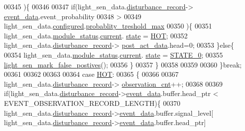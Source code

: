 \begin{DoxyCode}
00345                )\{
00346 
00347                    \textcolor{keywordflow}{if}(light\_sen\_data.\hyperlink{a00024_ac9b38e2c1d3f1013a88d33506c754152}{disturbance\_record}->
      \hyperlink{a00028_a8c0bda69e71ef674e60da47ad0be9ab0}{event\_data}.event\_probability
00348                     >
00349                     light\_sen\_data.\hyperlink{a00024_a94b2d1f6ea4ab334c74d24984dd27843}{configured}.\hyperlink{a00021_a7e2d217b9c9051d361319180a426851c}{probablity\_treshold\_max}
00350                     )\{
00351                          light\_sen\_data.\hyperlink{a00024_a5a53c391562b059eb744ac679f3765ca}{module\_status}.\hyperlink{a00017_ab8af48cdbba92b3ae39c4470e53af944}{current}.
      \hyperlink{a00017_a6b8d8e916bc56265a3fd279bd26b6d1b}{state} = \hyperlink{a00021_a1eb14cc432874ddacd1934791dbe12a3}{HOT};
00352                          light\_sen\_data.\hyperlink{a00024_ac9b38e2c1d3f1013a88d33506c754152}{disturbance\_record}->
      \hyperlink{a00028_a9c699c0cc82d0baa6e49195f185ab34f}{post\_act\_data}.head=0;
00353                      \}\textcolor{keywordflow}{else}\{
00354                          light\_sen\_data.\hyperlink{a00024_a5a53c391562b059eb744ac679f3765ca}{module\_status}.\hyperlink{a00017_ab8af48cdbba92b3ae39c4470e53af944}{current}.
      \hyperlink{a00017_a6b8d8e916bc56265a3fd279bd26b6d1b}{state} = \hyperlink{a00021_ad6739dbbe5581cac99b7dc8a5e09949c}{STATE\_0};
00355                          \hyperlink{a00047_acef1622ec5c40fe90bf6184813716e34}{light\_sen\_mark\_false\_postives}();
00356                     \}
00357              \}
00358 
00359 
00360          \}\textcolor{keywordflow}{break};
00361 
00362 
00363 
00364          \textcolor{keywordflow}{case} \hyperlink{a00021_a1eb14cc432874ddacd1934791dbe12a3}{HOT}:
00365         \{
00366 
00367              light\_sen\_data.\hyperlink{a00024_ac9b38e2c1d3f1013a88d33506c754152}{disturbance\_record}->
      \hyperlink{a00028_ad5b0bac02ce266b91b2b52a1c3ea1d78}{observation\_cnt}++;
00368 
00369             \textcolor{keywordflow}{if}(light\_sen\_data.\hyperlink{a00024_ac9b38e2c1d3f1013a88d33506c754152}{disturbance\_record}->\hyperlink{a00028_a8c0bda69e71ef674e60da47ad0be9ab0}{event\_data}.buffer.head\_ptr < 
      EVENT\_OBSERVATION\_RECORD\_LENGTH)\{
00370             light\_sen\_data.\hyperlink{a00024_ac9b38e2c1d3f1013a88d33506c754152}{disturbance\_record}->\hyperlink{a00028_a8c0bda69e71ef674e60da47ad0be9ab0}{event\_data}.buffer.signal\_level[
      light\_sen\_data.\hyperlink{a00024_ac9b38e2c1d3f1013a88d33506c754152}{disturbance\_record}->\hyperlink{a00028_a8c0bda69e71ef674e60da47ad0be9ab0}{event\_data}.buffer.head\_ptr]

\end{DoxyCode}
